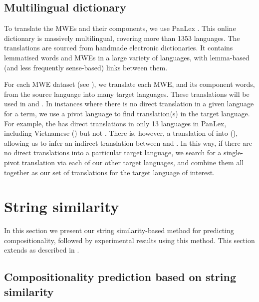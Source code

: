 \documentclass[output=paper,modfonts,nonflat]{langsci/langscibook}
\begin{document}
\subsection{Multilingual dictionary\label{sec:multilingdict}}

To translate the MWEs and their components, we use PanLex
\citep{baldwin2010}. This online dictionary is massively multilingual,
covering more than 1353 languages. The translations are sourced from
handmade electronic dictionaries. It contains lemmatised words and
MWEs in a large variety of languages, with lemma-based (and less
frequently sense-based) links between them. 

For each MWE dataset (see ), we translate each
MWE, and its component words, from the source language into many
target languages. These translations will be used in
 and . In instances where
there is no direct translation in a given language for a term, we use
a pivot language to find translation(s) in the target language. For
example, the    has direct
translations in only 13 languages in PanLex, including Vietnamese
() but not . There is, however, a
translation of  into 
(), allowing us to infer an indirect translation
between  and . In this way,
if there are no direct translations into a particular target language,
we search for a single-pivot translation via each of our other target
languages, and combine them all together as our set of translations
for the target language of interest.


\section{String similarity\label{sec:stringsim}}

In this section we present our string similarity-based method for
predicting compositionality, followed by experimental results using
this method. This section extends \cite{salehi2013} as described in
.


\subsection{Compositionality prediction based on string similarity\label{sec:stringsimmethod}}
\end{document}
